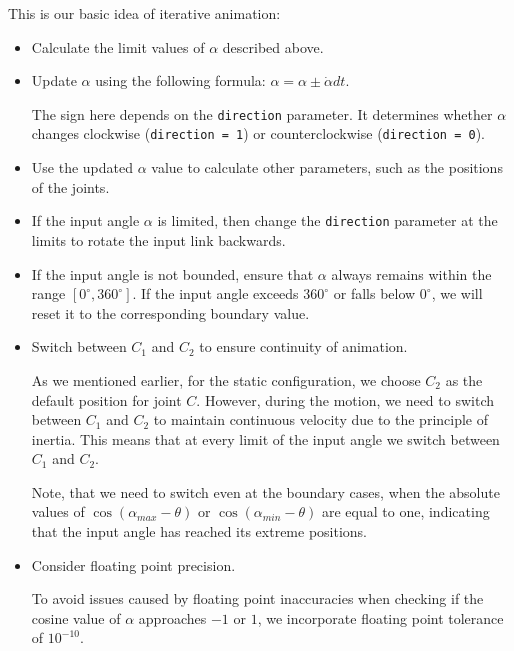 \documentclass{article}
\begin{document}
This is our basic idea of iterative animation:
\begin{itemize}
	\item Calculate the limit values of $\alpha$ described above.
	
	\item Update $\alpha$ using the following formula: $\alpha = \alpha \pm \dot{\alpha} dt$.
		 
	The sign here depends on the \texttt{direction} parameter. It determines whether $\alpha$ changes clockwise (\texttt{direction = 1}) or counterclockwise (\texttt{direction = 0}).
	 
	\item Use the updated $\alpha$ value to calculate other parameters, such as the positions of the joints.
		 
	\item If the input angle $\alpha$ is limited, then change the \texttt{direction} parameter at the limits to rotate the input link backwards.
		 
	\item If the input angle is not bounded, ensure that $\alpha$ always remains within the range $[0^\circ, 360^\circ]$. If the input angle exceeds $360^\circ$ or falls below $0^\circ$, we will reset it to the corresponding boundary value.
		 
	\item Switch between $C_1$ and $C_2$ to ensure continuity of animation.
	
	As we mentioned earlier, for the static configuration, we choose $C_2$ as the default position for joint $C$. However, during the motion, we need to switch between $C_1$ and $C_2$ to maintain continuous velocity due to the principle of inertia. This means that at every limit of the input angle we switch between $C_1$ and $C_2$.
	
	Note, that we need to switch even at the boundary cases, when the absolute values of $\cos(\alpha_{max}-\theta)$ or $\cos(\alpha_{min}-\theta)$ are equal to one, indicating that the input angle has reached its extreme positions.

	\item Consider floating point precision.
	
	To avoid issues caused by floating point inaccuracies when checking if the cosine value of $\alpha$ approaches $-1$ or $1$, we incorporate floating point tolerance of $10^{-10}$.
\end{itemize}
\end{document}
